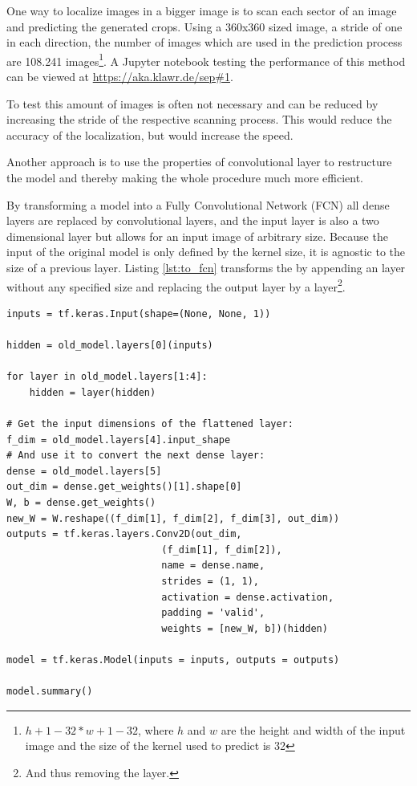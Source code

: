 One way to localize images in a bigger image is to scan each sector of an image and predicting the generated crops.
Using a 360x360 sized image, a stride of one in each direction, the number of images which are used in the prediction process are 108.241 images\footnote{$h + 1 - 32 * w + 1 - 32$, where $h$ and $w$ are the height and width of the input image and the size of the kernel used to predict is 32}.
A Jupyter notebook testing the performance of this method can be viewed at \url{https://aka.klawr.de/sep#1}. %

To test this amount of images is often not necessary and can be reduced by increasing the stride of the respective scanning process.
This would reduce the accuracy of the localization, but would increase the speed.

Another approach is to use the properties of convolutional layer to restructure the model and thereby making the whole procedure much more efficient.

By transforming a model into a Fully Convolutional Network (FCN) all dense layers are replaced by convolutional layers, and the input layer is also a two dimensional layer but allows for an input image of arbitrary size.
Because the input of the original model is only defined by the kernel size, it is agnostic to the size of a previous layer.
Listing \ref{lst:to_fcn} transforms the  by appending an  layer without any specified size and replacing the output layer by a  layer\footnote{And thus removing the  layer.}.

\begin{lstlisting}[caption={Transformation into a FCN}, label=lst:to_fcn]
inputs = tf.keras.Input(shape=(None, None, 1))

hidden = old_model.layers[0](inputs)

for layer in old_model.layers[1:4]:
    hidden = layer(hidden)

# Get the input dimensions of the flattened layer:
f_dim = old_model.layers[4].input_shape
# And use it to convert the next dense layer:
dense = old_model.layers[5]
out_dim = dense.get_weights()[1].shape[0]
W, b = dense.get_weights()
new_W = W.reshape((f_dim[1], f_dim[2], f_dim[3], out_dim))
outputs = tf.keras.layers.Conv2D(out_dim,
                           (f_dim[1], f_dim[2]),
                           name = dense.name,
                           strides = (1, 1),
                           activation = dense.activation,
                           padding = 'valid',
                           weights = [new_W, b])(hidden)

model = tf.keras.Model(inputs = inputs, outputs = outputs)

model.summary()
\end{lstlisting}

